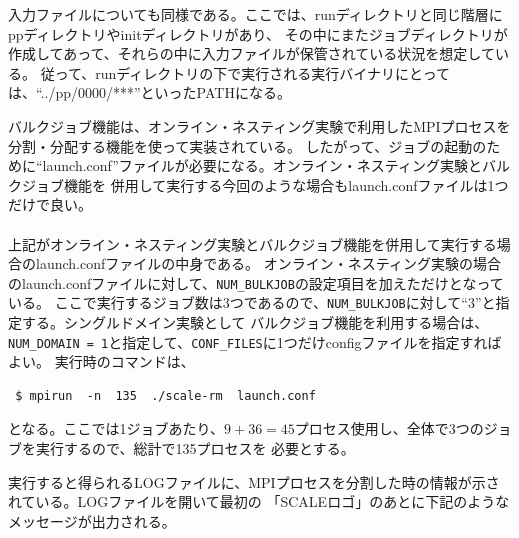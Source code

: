 入力ファイルについても同様である。ここでは、runディレクトリと同じ階層にppディレクトリやinitディレクトリがあり、
その中にまたジョブディレクトリが作成してあって、それらの中に入力ファイルが保管されている状況を想定している。
従って、runディレクトリの下で実行される実行バイナリにとっては、``../pp/0000/***''といったPATHになる。

バルクジョブ機能は、オンライン・ネスティング実験で利用したMPIプロセスを分割・分配する機能を使って実装されている。
したがって、ジョブの起動のために``launch.conf''ファイルが必要になる。オンライン・ネスティング実験とバルクジョブ機能を
併用して実行する今回のような場合もlaunch.confファイルは1つだけで良い。\\

\\

\noindent 上記がオンライン・ネスティング実験とバルクジョブ機能を併用して実行する場合のlaunch.confファイルの中身である。
オンライン・ネスティング実験の場合のlaunch.confファイルに対して、\verb|NUM_BULKJOB|の設定項目を加えただけとなっている。
ここで実行するジョブ数は3つであるので、\verb|NUM_BULKJOB|に対して``3''と指定する。シングルドメイン実験として
バルクジョブ機能を利用する場合は、\verb|NUM_DOMAIN = 1|と指定して、\verb|CONF_FILES|に1つだけconfigファイルを指定すればよい。
実行時のコマンドは、

\begin{verbatim}
 $ mpirun  -n  135  ./scale-rm  launch.conf
\end{verbatim}

となる。ここでは1ジョブあたり、$9 + 36 = 45$プロセス使用し、全体で3つのジョブを実行するので、総計で135プロセスを
必要とする。

実行すると得られるLOGファイルに、MPIプロセスを分割した時の情報が示されている。LOGファイルを開いて最初の
「SCALEロゴ」のあとに下記のようなメッセージが出力される。\\

